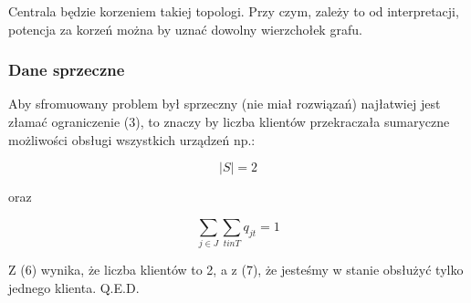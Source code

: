 \documentclass{article}
\begin{document}
Centrala będzie korzeniem takiej topologi. Przy czym, zależy to od interpretacji, potencja za korzeń można by uznać dowolny wierzchołek grafu.

\subsubsection{Dane sprzeczne}

Aby sfromuowany problem był sprzeczny (nie miał rozwiązań) najłatwiej jest złamać ograniczenie (3),
to znaczy by liczba klientów przekraczała sumaryczne możliwości obsługi wszystkich urządzeń np.:

\begin{equation}
  |S| = 2
\end{equation}

oraz

\begin{equation}
  \sum_{j \in J} \sum_{t in T} q_{jt} = 1
\end{equation}

Z (6) wynika, że liczba klientów to 2, a z (7), że jesteśmy w stanie obsłużyć tylko jednego klienta. Q.E.D.
\end{document}
